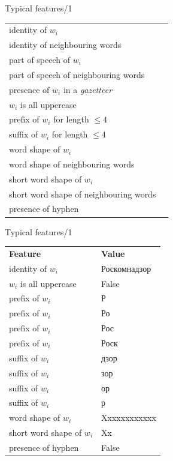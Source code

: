 \documentclass[10pt, compress]{beamer}
\begin{document}


\begin{frame}{Typical features/1}

\begin{tabular}{ll}
identity of $w_i$  &  \\
identity of neighbouring words  &  \\
part of speech of $w_i$  &  \\
part of speech of neighbouring words  &  \\
presence of $w_i$ in a \emph{gazetteer} &  \\
$w_i$ is all uppercase &  \\
prefix of $w_i$ for length $\le 4$ &  \\
suffix of $w_i$ for length $\le 4$ &  \\
word shape of $w_i$ &  \\
word shape of neighbouring words &  \\
short word shape of $w_i$ \\
short word shape of neighbouring words &  \\
presence of hyphen &  \\

\end{tabular}

\end{frame}

\begin{frame}{Typical features/1}

\begin{tabular}{ll}
\textbf{Feature} & \textbf{Value} \\ 
identity of $w_i$  & Роскомнадзор \\
$w_i$ is all uppercase & False \\
prefix of $w_i$ & Р \\
prefix of $w_i$ & Ро \\
prefix of $w_i$ & Рос \\
prefix of $w_i$ & Роск \\
suffix of $w_i$ & дзор \\
suffix of $w_i$ & зор \\
suffix of $w_i$ & ор \\
suffix of $w_i$ & р \\
word shape of $w_i$ & Xxxxxxxxxxxx \\
short word shape of $w_i$ & Xx \\
presence of hyphen & False  \\

\end{tabular}

\end{frame}
\end{document}
